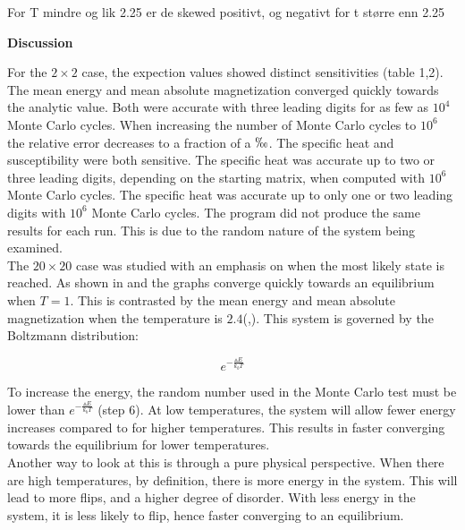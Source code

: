 \documentclass[10pt,a4paper]{article}
\begin{document}
For T mindre og lik 2.25 er de skewed positivt, og negativt for t større enn 2.25

  





\newpage
{\LARGE\bf
Discussion 
}

\noindent For the $2 \times 2$ case, the expection values showed distinct sensitivities (table 1,2). The mean energy and mean absolute magnetization converged quickly towards the analytic value. Both were accurate with three leading digits for as few as $10^4$ Monte Carlo cycles. When increasing the number of Monte Carlo cycles to $10^6$ the relative error decreases to a fraction of a $\permil$. The specific heat and susceptibility were both sensitive. The specific heat was accurate up to two or three leading digits, depending on the starting matrix, when computed with $10^6$ Monte Carlo cycles. The specific heat was accurate up to only one or two leading digits with $10^6$ Monte Carlo cycles. The program did not produce the same results for each run. This is due to the random nature of the system being examined.\\

\noindent The $20 \times 20$ case was studied with an emphasis on when the most likely state is reached. As shown in  and  the graphs converge quickly towards an equilibrium when $T=1$. This is contrasted by the mean energy and mean absolute magnetization when the temperature is $2.4$(,). This system is governed by the Boltzmann distribution:

$$ e^{-\frac{\vartriangle E}{k_bT}}$$

\noindent To increase the energy, the random number used in the Monte Carlo test must be lower than $e^{-\frac{\vartriangle E}{k_bT}}$  (step 6). At low temperatures, the system will allow fewer energy increases compared to for higher temperatures. This results in faster converging towards the equilibrium for lower temperatures.\\

\noindent Another way to look at this is through a pure physical perspective. When there are high temperatures, by definition, there is more energy in the system. This will lead to more flips, and a higher degree of disorder. With less energy in the system, it is less likely to flip, hence faster converging to an equilibrium.\\
\end{document}
